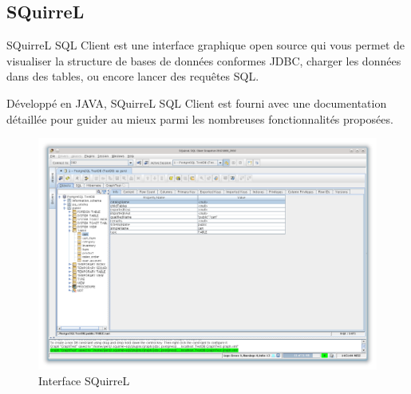 \subsection{SQuirreL}
\par SQuirreL SQL Client est une interface graphique open source qui vous permet de visualiser la structure de bases de données conformes JDBC, charger les données dans des tables, ou encore lancer des requêtes SQL.
\par Développé en JAVA, SQuirreL SQL Client est fourni avec une documentation détaillée pour guider au mieux parmi les nombreuses fonctionnalités proposées.
\begin{figure}[ht]
    \centering
    \includegraphics[width=\columnwidth]{img/sqrl.png}
    \caption{Interface SQuirreL}
\end{figure}
